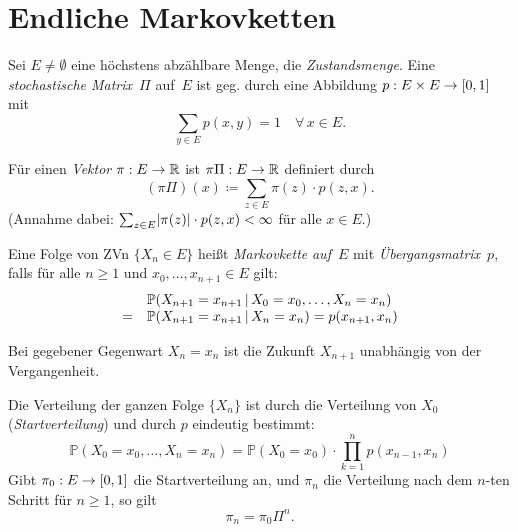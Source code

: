 \documentclass{cheat-sheet}
\renewcommand{\P}{\mathbb{P}} %
\begin{document}
\raggedcolumns %


\section{Endliche Markovketten}

\begin{setting}
  Sei $E \neq \emptyset$ eine höchstens abzählbare Menge, die \textit{Zustandsmenge}.
  Eine \emph{stochastische Matrix}~$\Pi$ auf~$E$ ist geg. durch eine Abbildung $p : E \times E \to \left[ 0, 1 \right]$ mit
  \[
    {\sum}_{y \in E} p(x, y) = 1 \quad
    \forall\,x \in E.
  \]
\end{setting}

\begin{defn}
  Für einen \textit{Vektor} $\pi : E \to \mathbb{R}$ ist $\pi \Pi : E \to \mathbb{R}$ definiert durch
  \[
    (\pi \Pi)(x) \coloneqq {\sum}_{z \in E} \pi(z) \cdot p(z, x).
  \]
  (Annahme dabei: ${\sum}_{z \in E} \abs{\pi(z)} \cdot p(z, x) < \infty$ für alle $x \in E$.)
\end{defn}

\begin{defn}
  Eine Folge von ZVn $\{ X_n \in E \}$ heißt \emph{Markovkette} \textit{auf~$E$} mit \textit{Übergangsmatrix}~$p$, falls für alle $n \geq 1$ und $x_0, \ldots, x_{n+1} \in E$ gilt:
  \[
    \begin{array}{r l}
      & \P(X_{n+1} = x_{n+1} \,|\, X_0=x_0, \ldots, X_n=x_n) \\
      = & \P(X_{n+1} = x_{n+1} \,|\, X_n=x_n)
      = p(x_{n+1}, x_n)
    \end{array}
  \]
\end{defn}

\begin{interp}
  Bei gegebener Gegenwart $X_n = x_n$ ist die Zukunft $X_{n+1}$ unabhängig von der Vergangenheit.
\end{interp}

\begin{bem}
  Die Verteilung der ganzen Folge $\{ X_n \}$ ist durch die Verteilung von $X_0$ (\textit{Startverteilung}) und durch $p$ eindeutig bestimmt:
  \[
    \P(X_0=x_0, \ldots, X_n=x_n) = \P(X_0=x_0) \cdot {\prod}_{k=1}^n p(x_{n-1}, x_n)
  \]
  Gibt $\pi_0 : E \to \left[ 0, 1 \right]$ die Startverteilung an, und $\pi_n$ die Verteilung nach dem $n$-ten Schritt für $n \geq 1$, so gilt
  \[
    \pi_n = \pi_0 \Pi^n.
  \]
\end{bem}
\end{document}
